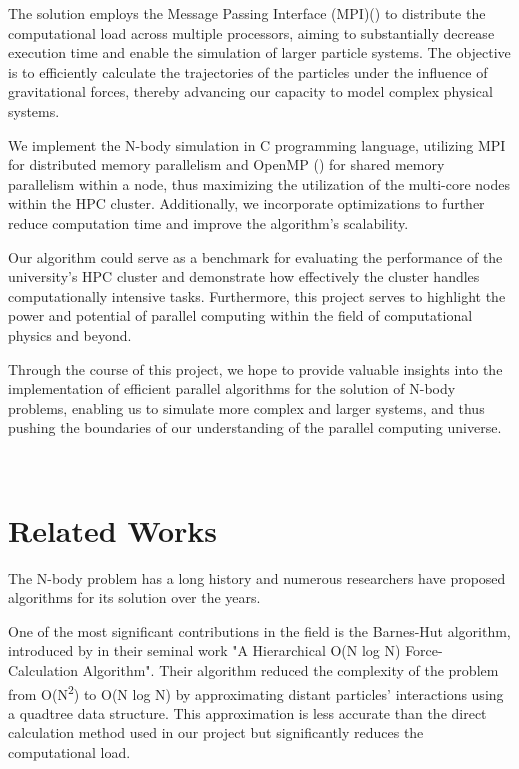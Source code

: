 \documentclass{solutionclass} %
\begin{document}
The solution employs the Message Passing Interface (MPI)(\textcite{mpi1994mpi}) to distribute the computational load across multiple processors, aiming to substantially decrease execution time and enable the simulation of larger particle systems. The objective is to efficiently calculate the trajectories of the particles under the influence of gravitational forces, thereby advancing our capacity to model complex physical systems.

We implement the N-body simulation in C programming language, utilizing MPI for distributed memory parallelism and OpenMP (\textcite{openmp1998openmp}) for shared memory parallelism within a node, thus maximizing the utilization of the multi-core nodes within the HPC cluster. Additionally, we incorporate optimizations to further reduce computation time and improve the algorithm's scalability.

Our algorithm could serve as a benchmark for evaluating the performance of the university's HPC cluster and demonstrate how effectively the cluster handles computationally intensive tasks. Furthermore, this project serves to highlight the power and potential of parallel computing within the field of computational physics and beyond.

Through the course of this project, we hope to provide valuable insights into the implementation of efficient parallel algorithms for the solution of N-body problems, enabling us to simulate more complex and larger systems, and thus pushing the boundaries of our understanding of the parallel computing universe.

\divider
\\
\section{Related Works}

The N-body problem has a long history and numerous researchers have proposed algorithms for its solution over the years.

One of the most significant contributions in the field is the Barnes-Hut algorithm, introduced by \textbf{\textcite{barnes1986hierarchical}} in their seminal work "A Hierarchical O(N log N) Force-Calculation Algorithm". Their algorithm reduced the complexity of the problem from O(N\textsuperscript{2}) to O(N log N) by approximating distant particles' interactions using a quadtree data structure. This approximation is less accurate than the direct calculation method used in our project but significantly reduces the computational load.
\end{document}
